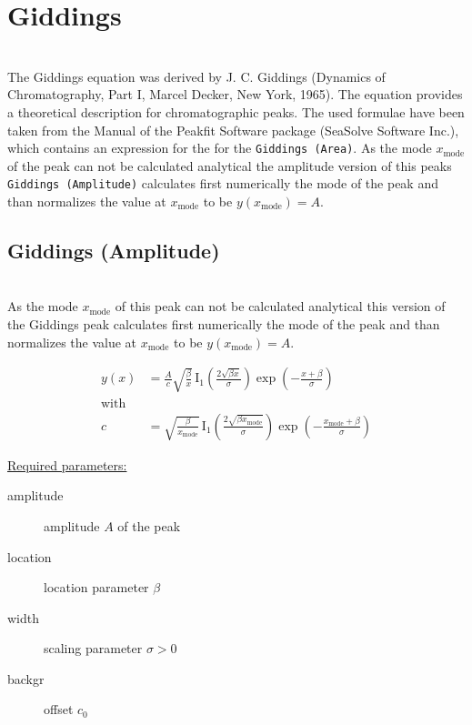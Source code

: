 \clearpage
\section{Giddings} ~\\
\label{sec:Giddings} The Giddings equation was derived by J. C.
Giddings (Dynamics of Chromatography, Part I, Marcel Decker, New
York, 1965). The equation provides a theoretical description for
chromatographic peaks. The used formulae have been taken from the
Manual of the Peakfit Software package (SeaSolve Software Inc.),
which contains an expression for the for the \texttt{Giddings
(Area)}. As the mode $x_\text{mode}$ of the peak can not be
calculated analytical the amplitude version of this peaks
\texttt{Giddings (Amplitude)} calculates first numerically the mode
of the peak and than normalizes the value at $x_\text{mode}$ to be
$y(x_\text{mode})=A$.

\clearpage
\subsection{Giddings (Amplitude)} ~\\
\label{sec:GiddingsAmplitude} As the mode $x_\text{mode}$ of this
peak can not be calculated analytical this version of the Giddings
peak calculates first numerically the mode of the peak and than
normalizes the value at $x_\text{mode}$ to be $y(x_\text{mode})=A$.

\begin{subequations}
\begin{align}
y(x) & = \frac{A}{c} \sqrt{\frac{\beta}{x}} \,
\mathrm{I}_1\left(\frac{2\sqrt{\beta x}}{\sigma}\right)
\exp\left(-\frac{x+\beta}{\sigma}\right) \\
\text{with } & \nonumber \\
c & = \sqrt{\frac{\beta}{x_\text{mode}}} \,
\mathrm{I}_1\left(\frac{2\sqrt{\beta x_\text{mode}}}{\sigma}\right)
\exp\left(-\frac{x_\text{mode}+\beta}{\sigma}\right)
\end{align}
\end{subequations}

\underline{Required parameters:}
\begin{description}
    \item[amplitude] amplitude $A$ of the peak
    \item[location] location parameter $\beta$
    \item[width] scaling parameter $\sigma > 0$
    \item[backgr] offset $c_0$
\end{description}

